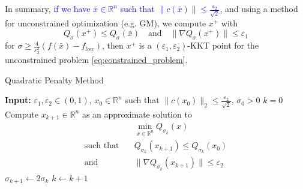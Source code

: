 \documentclass[12pt, openany]{report}
\newcommand{\R}{\mathbb{R}}
\renewcommand{\O}{\mathcal{O}}
\theoremstyle{definition}
\begin{document}
In summary, \textcolor{blue}{if we have $\bar{x} \in \R^n$ such that $\|c(\bar{x})\| \leq \frac{\varepsilon_2}{\sqrt{2}}$}, and using a method for unconstrained optimization (e.g. GM), we compute $x^+$ with
\begin{equation}
	Q_\sigma(x^+) \leq Q_\sigma(\bar{x}) \quad \text{and} \quad \|\nabla Q_\sigma(x^+)\| \leq \varepsilon_1
\end{equation}
for $\sigma \geq \frac{4}{\varepsilon_2^2} (f(\bar{x})-f_{low})$, then $x^+$ is a $(\varepsilon_1,\varepsilon_2)$-KKT point for the unconstrained problem \eqref{eq:constrained_problem}.\\
\newline
\begin{algorithm}
	\caption{Quadratic Penalty Method}
	\begin{algorithmic}[1]
		\State \textbf{Input:} $\varepsilon_1, \varepsilon_2 \in (0,1)$, $x_0 \in \R^n$ such that $\|c(x_0)\|_2 \leq \frac{\varepsilon_2}{\sqrt{2}}$, $\sigma_0 > 0$
		\State $k=0$
			\State Compute $x_{k+1} \in \R^n$ as an approximate solution to 
			\begin{equation}\label{eq:step1}
				\begin{aligned}
					&\min_{x \in \R^n} Q_{\sigma_k}(x)\\
					\text{such that} \quad &Q_{\sigma_k}(x_{k+1}) \leq Q_{\sigma_k}(x_0)\\
					\text{and} \quad &\|\nabla Q_{\sigma_k}(x_{k+1})\| \leq \varepsilon_2 
				\end{aligned}
			\end{equation}
			\State $\sigma_{k+1} \gets 2\sigma_k$
			\State $k \gets k + 1$
		\EndWhile
	\end{algorithmic}
\end{algorithm}
\end{document}
